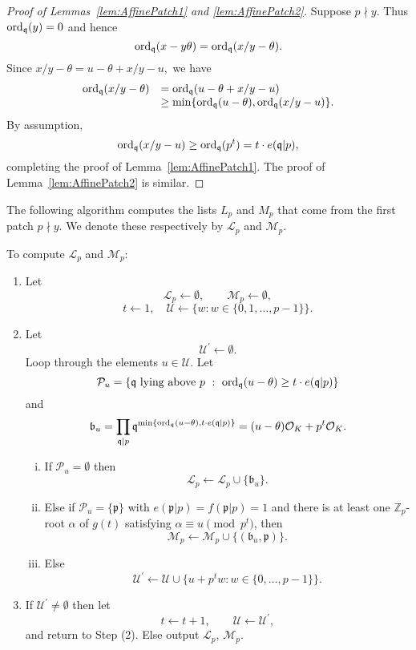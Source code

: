 \begin{proof}[Proof of Lemmas~\ref{lem:AffinePatch1} and \ref{lem:AffinePatch2}]
Suppose $p \nmid y$. Thus $\operatorname{ord}_{\mathfrak{q}}(y) = 0$ and hence 
\[\operatorname{ord}_{\mathfrak{q}}(x-y\theta) = \operatorname{ord}_{\mathfrak{q}}(x/y - \theta).\]
Since $x/y-\theta = u - \theta + x/y - u,$ we have
\[\begin{array}{ll}
\operatorname{ord}_\mathfrak{q}(x/y-\theta)	& = \operatorname{ord}_{\mathfrak{q}}(u - \theta + x/y - u) \\
						& \geq \min\{\operatorname{ord}_{\mathfrak{q}}(u - \theta), \operatorname{ord}_{\mathfrak{q}}(x/y - u)\}. 
\end{array}\]
By assumption, 
\[\operatorname{ord}_{\mathfrak{q}}(x/y-u) \geq \operatorname{ord}_{\mathfrak{q}}(p^t) = t \cdot e(\mathfrak{q}|p),\]
completing the proof of Lemma~\ref{lem:AffinePatch1}. The proof of Lemma~\ref{lem:AffinePatch2} is similar. 
\end{proof}

The following algorithm computes the lists $L_p$ and $M_p$ that come from the first patch $p \nmid y$. We denote these respectively by $\mathcal{L}_p$ and $\mathcal{M}_p$. 

\begin{algorithm} \label{alg:AffinePatch1}
To compute
$\mathcal{L}_p$ and $\mathcal{M}_p$:

\begin{enumerate}[Step (1)]
\item Let 
\[\mathcal{L}_p \leftarrow \emptyset, \qquad \mathcal{M}_p \leftarrow \emptyset,\]
\[ t \leftarrow 1, \quad \mathcal{U} \leftarrow \{w : w \in \{0,1,\dots,p-1\} \}.\]
\item Let
\[\mathcal{U}^\prime \leftarrow \emptyset.\]
Loop through the elements $u \in \mathcal{U}$. Let 
\[\mathcal{P}_u= \{\mathfrak{q} \text{ lying above } p \ : \ \operatorname{ord}_{\mathfrak{q}}(u-\theta) \geq t \cdot e(\mathfrak{q}|p)\}\]
and
\[ \mathfrak{b}_u 	= \prod_{\mathfrak{q} \mid p} \mathfrak{q}^{\min\{\operatorname{ord}_\mathfrak{q}(u-\theta), t \cdot e(\mathfrak{q}|p)\}} 
				= (u-\theta) \mathcal{O}_K+p^t \mathcal{O}_K.\]
\begin{enumerate}[(i)]
\item If $\mathcal{P}_u = \emptyset$ then
\[\mathcal{L}_p \leftarrow \mathcal{L}_p \cup \{\mathfrak{b}_u\}.\]
\item Else if $\mathcal{P}_u = \{\mathfrak{p}\}$ with $e(\mathfrak{p}|p)=f(\mathfrak{p}|p)=1$ and there is at least one $\mathbb{Z}_p$-root $\alpha$ of $g(t)$ satisfying $\alpha \equiv u \pmod{p^t}$, then
\[\mathcal{M}_p \leftarrow \mathcal{M}_p \cup \{ (\mathfrak{b}_u,\mathfrak{p})\}.\]
\item Else 
\[\mathcal{U}^\prime \leftarrow \mathcal{U} \cup \{ u+p^{t}w : w \in \{0,\dots,p-1\} \}.\]
\end{enumerate}

\item If $\mathcal{U}^\prime \ne \emptyset$ then let
\[t \leftarrow t+1, \qquad \mathcal{U} \leftarrow \mathcal{U}^{\prime},\]
and return to Step (2). Else output $\mathcal{L}_p$, $\mathcal{M}_p$.
\end{enumerate}
\end{algorithm}

